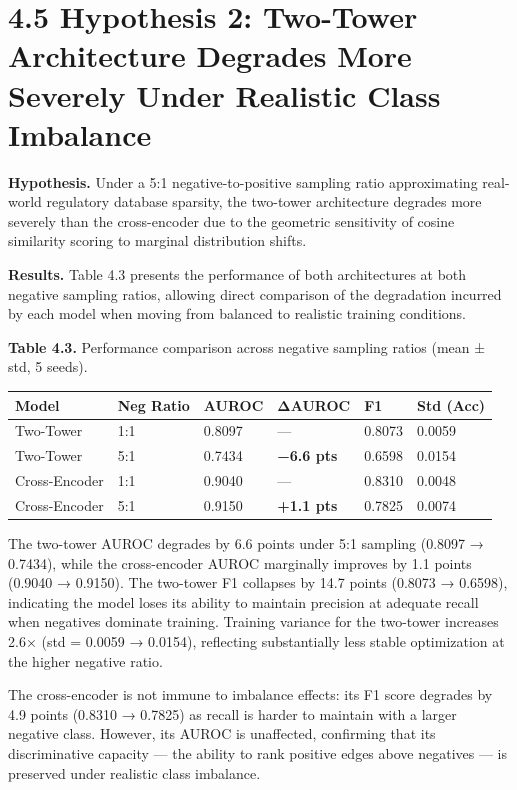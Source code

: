 \documentclass[
  12pt,
]{report}
\newcounter{none} %
\begin{document}
\section{4.5 Hypothesis 2: Two-Tower Architecture Degrades More Severely
Under Realistic Class
Imbalance}\label{hypothesis-2-two-tower-architecture-degrades-more-severely-under-realistic-class-imbalance}

\textbf{Hypothesis.} Under a 5:1 negative-to-positive sampling ratio
approximating real-world regulatory database sparsity, the two-tower
architecture degrades more severely than the cross-encoder due to the
geometric sensitivity of cosine similarity scoring to marginal
distribution shifts.

\textbf{Results.} Table 4.3 presents the performance of both
architectures at both negative sampling ratios, allowing direct
comparison of the degradation incurred by each model when moving from
balanced to realistic training conditions.

\textbf{Table 4.3.} Performance comparison across negative sampling
ratios (mean ± std, 5 seeds).

{\def\LTcaptype{none} %
\begin{longtable}[]{@{}llllll@{}}
\toprule\noalign{}
Model & Neg Ratio & AUROC & ΔAUROC & F1 & Std (Acc) \\
\midrule\noalign{}
\endhead
\bottomrule\noalign{}
\endlastfoot
Two-Tower & 1:1 & 0.8097 & --- & 0.8073 & 0.0059 \\
Two-Tower & 5:1 & 0.7434 & \textbf{−6.6 pts} & 0.6598 & 0.0154 \\
Cross-Encoder & 1:1 & 0.9040 & --- & 0.8310 & 0.0048 \\
Cross-Encoder & 5:1 & 0.9150 & \textbf{+1.1 pts} & 0.7825 & 0.0074 \\
\end{longtable}
}

The two-tower AUROC degrades by 6.6 points under 5:1 sampling (0.8097 →
0.7434), while the cross-encoder AUROC marginally improves by 1.1 points
(0.9040 → 0.9150). The two-tower F1 collapses by 14.7 points (0.8073 →
0.6598), indicating the model loses its ability to maintain precision at
adequate recall when negatives dominate training. Training variance for
the two-tower increases 2.6× (std = 0.0059 → 0.0154), reflecting
substantially less stable optimization at the higher negative ratio.

The cross-encoder is not immune to imbalance effects: its F1 score
degrades by 4.9 points (0.8310 → 0.7825) as recall is harder to maintain
with a larger negative class. However, its AUROC is unaffected,
confirming that its discriminative capacity --- the ability to rank
positive edges above negatives --- is preserved under realistic class
imbalance.
\end{document}
